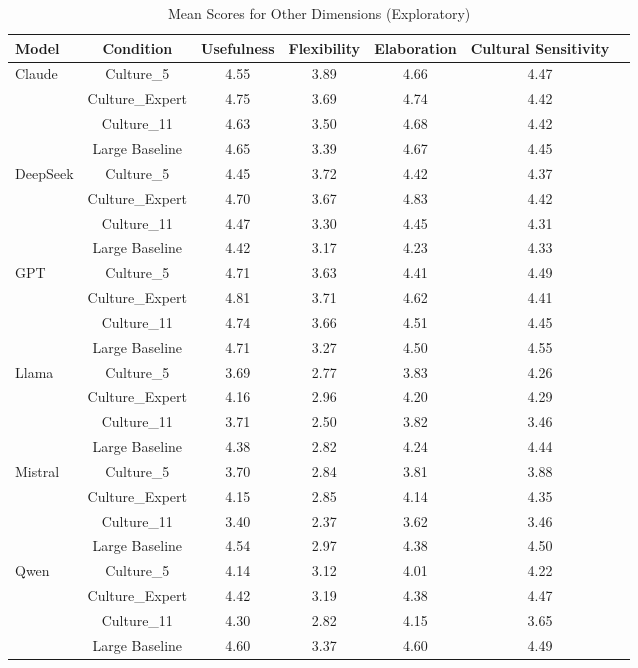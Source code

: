 \documentclass{article}
\begin{document}
\begin{table}[H]
\centering
\caption{Mean Scores for Other Dimensions (Exploratory)}
\label{tab:other_dimensions}
\begin{tabular}{lcccccc}
\toprule
Model & Condition & Usefulness & Flexibility & Elaboration & Cultural Sensitivity \\
\midrule
\multirow{4}{*}{Claude} & Culture\_5 & 4.55 & 3.89 & 4.66 & 4.47 \\
 & Culture\_Expert & 4.75 & 3.69 & 4.74 & 4.42 \\
 & Culture\_11 & 4.63 & 3.50 & 4.68 & 4.42 \\
 & Large Baseline & 4.65 & 3.39 & 4.67 & 4.45 \\
\midrule
\multirow{4}{*}{DeepSeek} & Culture\_5 & 4.45 & 3.72 & 4.42 & 4.37 \\
 & Culture\_Expert & 4.70 & 3.67 & 4.83 & 4.42 \\
 & Culture\_11 & 4.47 & 3.30 & 4.45 & 4.31 \\
 & Large Baseline & 4.42 & 3.17 & 4.23 & 4.33 \\
\midrule
\multirow{4}{*}{GPT} & Culture\_5 & 4.71 & 3.63 & 4.41 & 4.49 \\
 & Culture\_Expert & 4.81 & 3.71 & 4.62 & 4.41 \\
 & Culture\_11 & 4.74 & 3.66 & 4.51 & 4.45 \\
 & Large Baseline & 4.71 & 3.27 & 4.50 & 4.55 \\
\midrule
\multirow{4}{*}{Llama} & Culture\_5 & 3.69 & 2.77 & 3.83 & 4.26 \\
 & Culture\_Expert & 4.16 & 2.96 & 4.20 & 4.29 \\
 & Culture\_11 & 3.71 & 2.50 & 3.82 & 3.46 \\
 & Large Baseline & 4.38 & 2.82 & 4.24 & 4.44 \\
\midrule
\multirow{4}{*}{Mistral} & Culture\_5 & 3.70 & 2.84 & 3.81 & 3.88 \\
 & Culture\_Expert & 4.15 & 2.85 & 4.14 & 4.35 \\
 & Culture\_11 & 3.40 & 2.37 & 3.62 & 3.46 \\
 & Large Baseline & 4.54 & 2.97 & 4.38 & 4.50 \\
\midrule
\multirow{4}{*}{Qwen} & Culture\_5 & 4.14 & 3.12 & 4.01 & 4.22 \\
 & Culture\_Expert & 4.42 & 3.19 & 4.38 & 4.47 \\
 & Culture\_11 & 4.30 & 2.82 & 4.15 & 3.65 \\
 & Large Baseline & 4.60 & 3.37 & 4.60 & 4.49 \\

\end{tabular}
\end{table}
\end{document}
